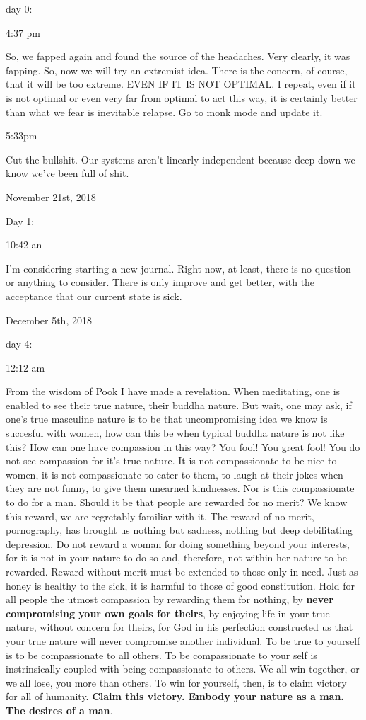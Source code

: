 day 0:

4:37 pm

So, we fapped again and found the source of the headaches. Very clearly,
it was fapping. So, now we will try an extremist idea. There is the
concern, of course, that it will be too extreme. EVEN IF IT IS NOT
OPTIMAL. I repeat, even if it is not optimal or even very far from
optimal to act this way, it is certainly better than what we fear is
inevitable relapse. Go to monk mode and update it.

5:33pm

Cut the bullshit. Our systems aren't linearly independent because deep
down we know we've been full of shit.

\bigskip
\bigskip
November 21st, 2018

Day 1:

10:42 an

I'm considering starting a new journal. Right now, at least, there is no
question or anything to consider. There is only improve and get better,
with the acceptance that our current state is sick.

\bigskip
\bigskip
December 5th, 2018

day 4:

12:12 am

From the wisdom of Pook I have made a revelation. When meditating, one
is enabled to see their true nature, their buddha nature. But wait, one
may ask, if one's true masculine nature is to be that uncompromising
idea we know is succesful with women, how can this be when typical
buddha nature is not like this? How can one have compassion in this way?
You fool! You great fool! You do not see compassion for it's true
nature. It is not compassionate to be nice to women, it is not
compassionate to cater to them, to laugh at their jokes when they are
not funny, to give them unearned kindnesses. Nor is this compassionate
to do for a man. Should it be that people are rewarded for no merit? We
know this reward, we are regretably familiar with it. The reward of no
merit, pornography, has brought us nothing but sadness, nothing but deep
debilitating depression. Do not reward a woman for doing something
beyond your interests, for it is not in your nature to do so and,
therefore, not within her nature to be rewarded. Reward without merit
must be extended to those only in need. Just as honey is healthy to the
sick, it is harmful to those of good constitution. Hold for all people
the utmost compassion by rewarding them for nothing, by \textbf{never
compromising your own goals for theirs}, by enjoying life in your true
nature, without concern for theirs, for God in his perfection
constructed us that your true nature will never compromise another
individual. To be true to yourself is to be compassionate to all others.
To be compassionate to your self is instrinsically coupled with being
compassionate to others. We all win together, or we all lose, you more
than others. To win for yourself, then, is to claim victory for all of
humanity. \textbf{Claim this victory. Embody your nature as a man. The
desires of a man}.

